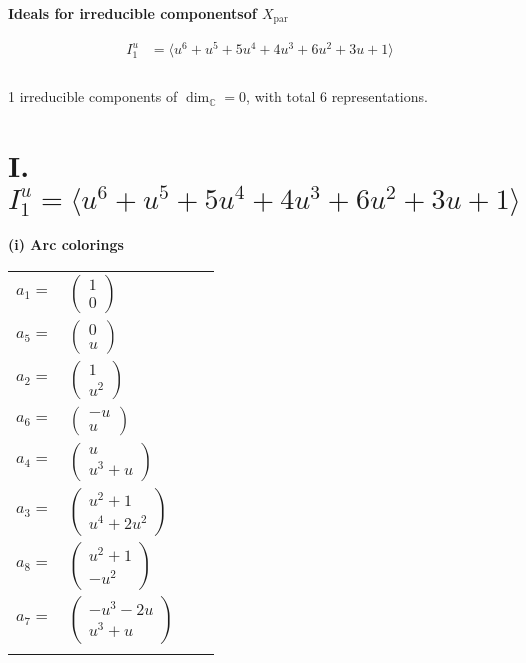 \documentclass[1p]{elsarticle_modified}
\theoremstyle{definition}
\begin{document}
\phantom \\ \newline 
\centering \textbf{Ideals for irreducible components\footnotemark of $X_{\text{par}}$} 
 
\begin{align*}
I^u_{1}&=\langle 
u^6+u^5+5 u^4+4 u^3+6 u^2+3 u+1\rangle \\
\\
\end{align*}
\raggedright * 1 irreducible components of $\dim_{\mathbb{C}}=0$, with total 6 representations.\\
\newpage
\renewcommand{\arraystretch}{1}
\centering \section*{I. $I^u_{1}= \langle u^6+u^5+5 u^4+4 u^3+6 u^2+3 u+1 \rangle$}
\flushleft \textbf{(i) Arc colorings}\\
\begin{tabular}{m{7pt} m{180pt} m{7pt} m{180pt} }
\flushright $a_{1}=$&$\begin{pmatrix}1\\0\end{pmatrix}$ \\
\flushright $a_{5}=$&$\begin{pmatrix}0\\u\end{pmatrix}$ \\
\flushright $a_{2}=$&$\begin{pmatrix}1\\u^2\end{pmatrix}$ \\
\flushright $a_{6}=$&$\begin{pmatrix}- u\\u\end{pmatrix}$ \\
\flushright $a_{4}=$&$\begin{pmatrix}u\\u^3+u\end{pmatrix}$ \\
\flushright $a_{3}=$&$\begin{pmatrix}u^2+1\\u^4+2 u^2\end{pmatrix}$ \\
\flushright $a_{8}=$&$\begin{pmatrix}u^2+1\\- u^2\end{pmatrix}$ \\
\flushright $a_{7}=$&$\begin{pmatrix}- u^3-2 u\\u^3+u\end{pmatrix}$\\&\end{tabular}
\end{document}
